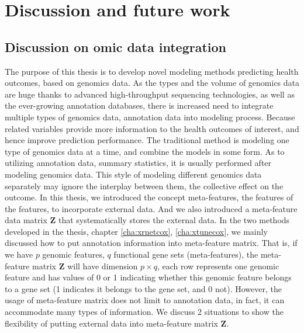 \chapter{Discussion and future work}
\label{cha:conclusion}

\section{Discussion on omic data integration}
The purpose of this thesis is to develop novel modeling methods predicting health outcomes, based on genomics data. As the types and the volume of genomics data are huge thanks to advanced high-throughput sequencing technologies, as well as the ever-growing annotation databases, there is increased need to integrate multiple types of genomics data, annotation data into modeling process. Because related variables provide more information to the health outcomes of interest, and hence improve prediction performance. The traditional method is modeling one type of genomics data at a time, and combine the models in some form. As to utilizing annotation data, summary statistics, it is usually performed after modeling genomics data. This style of modeling different genomics data separately may ignore the interplay between them, the collective effect on the outcome. In this thesis, we introduced the concept meta-features, the features of the features, to incorporate external data. And we also introduced a meta-feature data matrix $\bm{Z}$ that systematically stores the external data. In the two methods developed in the thesis, chapter \ref{cha:xrnetcox}, \ref{cha:xtunecox}, we mainly discussed how to put annotation information into meta-feature matrix. That is, if we have $p$ genomic features, $q$ functional gene sets (meta-features), the meta-feature matrix $\bm{Z}$ will have dimension $p\times q$, each row represents one genomic feature and has values of 0 or 1 indicating whether this genomic feature belongs to a gene set (1 indicates it belongs to the gene set, and 0 not). However, the usage of meta-feature matrix does not limit to annotation data, in fact, it can accommodate many types of information. We discuss 2 situations to show the flexibility of putting external data into meta-feature matrix $\bm{Z}$.

